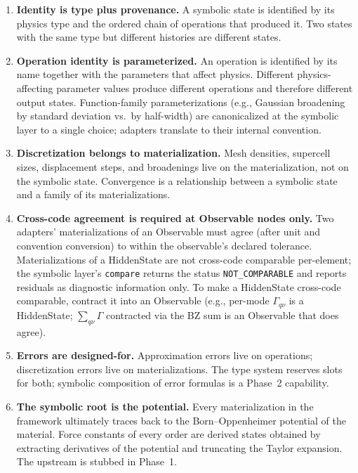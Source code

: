 \documentclass[11pt,a4paper]{article}
\begin{document}
\begin{enumerate}[leftmargin=2.5em, itemsep=0.4em]
  \item \textbf{Identity is type plus provenance.} A symbolic state is identified by its
        physics type and the ordered chain of operations that produced it. Two states
        with the same type but different histories are different states.

  \item \textbf{Operation identity is parameterized.} An operation is identified by its
        name together with the parameters that affect physics. Different physics-affecting
        parameter values produce different operations and therefore different output
        states. Function-family parameterizations (e.g., Gaussian broadening by standard
        deviation vs.\ by half-width) are canonicalized at the symbolic layer to a single
        choice; adapters translate to their internal convention.

  \item \textbf{Discretization belongs to materialization.} Mesh densities, supercell
        sizes, displacement steps, and broadenings live on the materialization, not on
        the symbolic state. Convergence is a relationship between a symbolic state and
        a family of its materializations.

  \item \textbf{Cross-code agreement is required at Observable nodes only.} Two
        adapters' materializations of an Observable must agree (after unit and
        convention conversion) to within the observable's declared tolerance.
        Materializations of a HiddenState are not cross-code comparable per-element;
        the symbolic layer's \texttt{compare} returns the status \texttt{NOT\_COMPARABLE}
        and reports residuals as diagnostic information only. To make a HiddenState
        cross-code comparable, contract it into an Observable (e.g., per-mode
        $\Gamma_{q\nu}$ is a HiddenState; $\sum_{q\nu}\Gamma$ contracted via the
        BZ sum is an Observable that does agree).

  \item \textbf{Errors are designed-for.} Approximation errors live on operations;
        discretization errors live on materializations. The type system reserves slots
        for both; symbolic composition of error formulas is a Phase~2 capability.

  \item \textbf{The symbolic root is the potential.} Every materialization in the framework
        ultimately traces back to the Born--Oppenheimer potential of the material. Force
        constants of every order are derived states obtained by extracting derivatives of
        the potential and truncating the Taylor expansion. The upstream is stubbed in
        Phase~1.


\end{enumerate}
\end{document}
